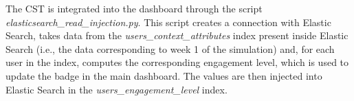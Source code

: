 The CST is integrated into the dashboard through the script \textit{elasticsearch\_read\_injection.py}. 
This script creates a connection with Elastic Search, takes data from the 
\textit{users\_context\_attributes} index present inside Elastic Search (i.e., the data corresponding 
to week 1 of the simulation) and, for each user in the index, computes the corresponding engagement level, 
which is used to update the badge in the main dashboard. The values are then injected into Elastic Search 
in the \textit{users\_engagement\_level} index.